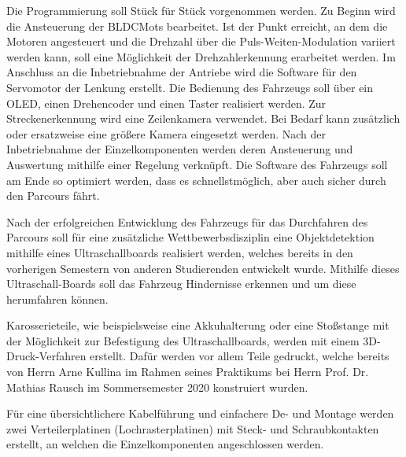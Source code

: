 Die Programmierung soll Stück für Stück vorgenommen werden. Zu Beginn wird die Ansteuerung der \acp{BLDCMot} bearbeitet. Ist der Punkt erreicht, an dem die Motoren angesteuert und die Drehzahl über die Puls-Weiten-Modulation variiert werden kann, soll eine Möglichkeit der Drehzahlerkennung erarbeitet werden. Im Anschluss an die Inbetriebnahme der Antriebe wird die Software für den Servomotor der Lenkung erstellt. Die Bedienung des Fahrzeugs soll über ein \ac{OLED}, einen Drehencoder und einen Taster realisiert werden. Zur Streckenerkennung wird eine Zeilenkamera verwendet. Bei Bedarf kann zusätzlich oder ersatzweise eine größere Kamera eingesetzt werden. Nach der Inbetriebnahme der Einzelkomponenten werden deren Ansteuerung und Auswertung mithilfe einer Regelung verknüpft. Die Software des Fahrzeugs soll am Ende so optimiert werden, dass es schnellstmöglich, aber auch sicher durch den Parcours fährt.\vspace{11pt}

Nach der erfolgreichen Entwicklung des Fahrzeugs für das Durchfahren des Parcours soll für eine zusätzliche Wettbewerbsdisziplin eine Objektdetektion mithilfe eines Ultraschallboards realisiert werden, welches bereits in den vorherigen Semestern von anderen Studierenden entwickelt wurde. Mithilfe dieses Ultraschall-Boards soll das Fahrzeug Hindernisse erkennen und um diese herumfahren können.\vspace{11pt}

Karosserieteile, wie beispielsweise eine  Akkuhalterung oder eine Stoßstange mit der Möglichkeit zur Befestigung des Ultraschallboards, werden mit einem 3D-Druck-Verfahren erstellt. Dafür werden vor allem Teile gedruckt, welche bereits von Herrn Arne Kullina im Rahmen seines Praktikums bei Herrn Prof. Dr. Mathias Rausch im Sommersemester 2020 konstruiert wurden.\vspace{11pt}

Für eine übersichtlichere Kabelführung und einfachere De- und Montage werden zwei Verteilerplatinen (Lochrasterplatinen) mit Steck- und Schraubkontakten erstellt, an welchen die Einzelkomponenten angeschlossen werden.

\newpage